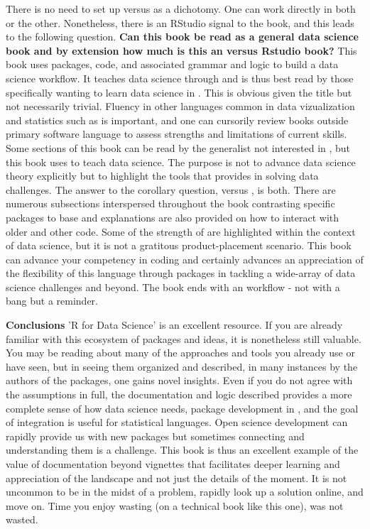 \documentclass[bookreview]{jss}
\begin{document}
There is no need to set up  versus  as a dichotomy. One can work directly in both or the other. Nonetheless, there is an RStudio signal to the book, and this leads to the following question. \textbf{Can this book be read as a general data science book and by extension how much is this an  versus Rstudio book?} This book uses  packages, code, and associated grammar and logic to build a data science workflow. It teaches data science through  and is thus best read by those specifically wanting to learn data science in . This is obvious given the title but not necessarily trivial. Fluency in other languages common in data vizualization and statistics such as  is important, and one can cursorily review books outside primary software language to assess strengths and limitations of current skills. Some sections of this book can be read by the generalist not interested in , but this book uses  to teach data science. The purpose is not to advance data science theory explicitly but to highlight the tools that  provides in solving data challenges. The answer to the corollary question,  versus , is both. There are numerous subsections interspersed throughout the book contrasting specific packages to base  and explanations are also provided on how to interact with older and other code. Some of the strength of  are highlighted within the context of data science, but it is not a gratitous product-placement scenario. This book can advance your competency in  coding and certainly advances an appreciation of the flexibility of this language through packages in tackling a wide-array of data science challenges and beyond. The book ends with an  workflow - not with a bang but a reminder. \newline

\textbf{Conclusions} \newline
'R for Data Science' is an excellent resource. If you are already familiar with this ecosystem of packages and ideas, it is nonetheless still valuable. You may be reading about many of the approaches and tools you already use or have seen, but in seeing them organized and described, in many instances by the authors of the packages, one gains novel insights. Even if you do not agree with the assumptions in full, the documentation and logic described provides a more complete sense of how data science needs, package development in , and the goal of integration is useful for statistical languages. Open science development can rapidly provide us with new packages but sometimes connecting and understanding them is a challenge. This book is thus an excellent example of the value of documentation beyond vignettes that facilitates deeper learning and appreciation of the landscape and not just the details of the moment. It is not uncommon to be in the midst of a problem, rapidly look up a solution online, and move on. Time you enjoy wasting (on a technical book like this one), was not wasted. 




\end{document}
